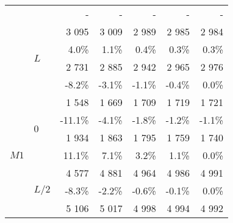 {{{\begin{tabularx}{0.65\textwidth}{@{} XX rrrrr@{}}
					&&{\color{black}\scriptsize-}&{\color{black}\scriptsize-}&{\color{black}\scriptsize-}&{\color{black}\scriptsize-}&{\color{black}\scriptsize-}\\\cmidrule[0.5\cmidrulewidth]{2-7}
					&\multirow{4}{*}{$L$}&{\color{Tblue}\normalsize3 095}&{\color{Tblue}\normalsize3 009}&{\color{Tblue}\normalsize2 989}&{\color{Tblue}\normalsize2 985}&{\color{Tblue}\normalsize2 984}\\
					&&{\color{Tblue}\scriptsize4.0\%}&{\color{Tblue}\scriptsize1.1\%}&{\color{Tblue}\scriptsize0.4\%}&{\color{Tblue}\scriptsize0.3\%}&{\color{Tblue}\scriptsize0.3\%}\\
					&&{\color{black}\normalsize2 731}&{\color{black}\normalsize2 885}&{\color{black}\normalsize2 942}&{\color{black}\normalsize2 965}&{\color{black}\normalsize2 976}\\
					&&{\color{black}\scriptsize-8.2\%}&{\color{black}\scriptsize-3.1\%}&{\color{black}\scriptsize-1.1\%}&{\color{black}\scriptsize-0.4\%}&{\color{black}\scriptsize0.0\%}\\\midrule
					\multirow{12}{*}{$M1$}&\multirow{4}{*}{$0$}&{\color{Tblue}\normalsize1 548}&{\color{Tblue}\normalsize1 669}&{\color{Tblue}\normalsize1 709}&{\color{Tblue}\normalsize1 719}&{\color{Tblue}\normalsize1 721}\\
					&&{\color{Tblue}\scriptsize-11.1\%}&{\color{Tblue}\scriptsize-4.1\%}&{\color{Tblue}\scriptsize-1.8\%}&{\color{Tblue}\scriptsize-1.2\%}&{\color{Tblue}\scriptsize-1.1\%}\\
					&&{\color{black}\normalsize1 934}&{\color{black}\normalsize1 863}&{\color{black}\normalsize1 795}&{\color{black}\normalsize1 759}&{\color{black}\normalsize1 740}\\
					&&{\color{black}\scriptsize11.1\%}&{\color{black}\scriptsize7.1\%}&{\color{black}\scriptsize3.2\%}&{\color{black}\scriptsize1.1\%}&{\color{black}\scriptsize0.0\%}\\\cmidrule[0.5\cmidrulewidth]{2-7}
					&\multirow{4}{*}{$L/2$}&{\color{Tblue}\normalsize4 577}&{\color{Tblue}\normalsize4 881}&{\color{Tblue}\normalsize4 964}&{\color{Tblue}\normalsize4 986}&{\color{Tblue}\normalsize4 991}\\
					&&{\color{Tblue}\scriptsize-8.3\%}&{\color{Tblue}\scriptsize-2.2\%}&{\color{Tblue}\scriptsize-0.6\%}&{\color{Tblue}\scriptsize-0.1\%}&{\color{Tblue}\scriptsize0.0\%}\\
					&&{\color{black}\normalsize5 106}&{\color{black}\normalsize5 017}&{\color{black}\normalsize4 998}&{\color{black}\normalsize4 994}&{\color{black}\normalsize4 992}\\

\end{tabularx}}}}
